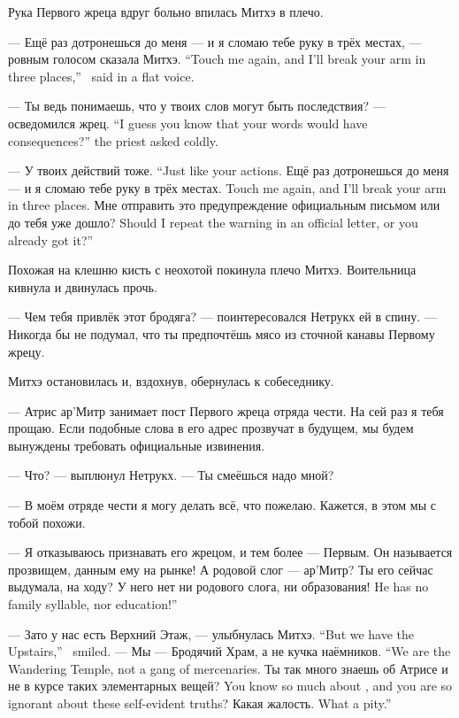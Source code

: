 Рука Первого жреца вдруг больно впилась Митхэ в плечо.

{--- Ещё раз дотронешься до меня --- и я сломаю тебе руку в трёх местах, --- ровным голосом сказала Митхэ.}
{``Touch me again, and I'll break your arm in three places,'' \Mitchoe\ said in a flat voice.}

{--- Ты ведь понимаешь, что у твоих слов могут быть последствия? --- осведомился жрец.}
{``I guess you know that your words would have consequences?'' the priest asked coldly.}

{--- У твоих действий тоже.}
{``Just like your actions.}
{Ещё раз дотронешься до меня --- и я сломаю тебе руку в трёх местах.}
{Touch me again, and I'll break your arm in three places.}
{Мне отправить это предупреждение официальным письмом или до тебя уже дошло?}
{Should I repeat the warning in an official letter, or you already got it?''}

Похожая на клешню кисть с неохотой покинула плечо Митхэ.
Воительница кивнула и двинулась прочь.

--- Чем тебя привлёк этот бродяга? --- поинтересовался Нетрукх ей в спину.
--- Никогда бы не подумал, что ты предпочтёшь мясо из сточной канавы Первому жрецу.

Митхэ остановилась и, вздохнув, обернулась к собеседнику.

--- Атрис ар'Митр занимает пост Первого жреца отряда чести.
На сей раз я тебя прощаю.
Если подобные слова в его адрес прозвучат в будущем, мы будем вынуждены требовать официальные извинения.

--- Что? --- выплюнул Нетрукх.
--- Ты смеёшься надо мной?

--- В моём отряде чести я могу делать всё, что пожелаю.
Кажется, в этом мы с тобой похожи.

--- Я отказываюсь признавать его жрецом, и тем более --- Первым.
Он называется прозвищем, данным ему на рынке!
А родовой слог --- ар'Митр?
Ты его сейчас выдумала, на ходу?
{У него нет ни родового слога, ни образования!}
{He has no family syllable, nor education!''}

{--- Зато у нас есть Верхний Этаж, --- улыбнулась Митхэ.}
{``But we have the Upstairs,'' \Mitchoe\ smiled.}
{--- Мы --- Бродячий Храм, а не кучка наёмников.}
{``We are the Wandering Temple, not a gang of mercenaries.}
{Ты так много знаешь об Атрисе и не в курсе таких элементарных вещей?}
{You know so much about \Aatris, and you are so ignorant about these self-evident truths?}
{Какая жалость.}
{What a pity.''}

